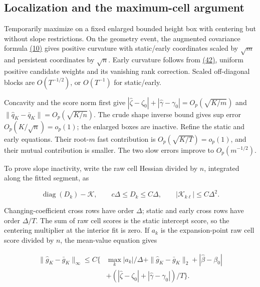 \documentclass[11pt]{article}
\begin{document}
\subsection{Localization and the maximum-cell argument}\label{sec:D.3}

Temporarily maximize on a fixed enlarged bounded height box with centering but without slope restrictions. On the geometry event, the augmented covariance formula \hyperref[eq:10]{(10)} gives positive curvature with static/early coordinates scaled by \(\sqrt m\) and persistent coordinates by \(\sqrt n\). Early curvature follows from \hyperref[eq:42]{(42)}, uniform positive candidate weights and its vanishing rank correction. Scaled off-diagonal blocks are \(O(T^{-1/2})\), or \(O(T^{-1})\) for static/early.

Concavity and the score norm first give
\(|\widehat\zeta-\zeta_0|+|\widehat\gamma-\gamma_0|=O_p(\sqrt{K/m})\)
and \(\|\widehat q_K-\bar q_K\|=O_p(\sqrt{K/n})\).
The crude shape inverse bound gives sup error \(O_p(K/\sqrt n)=o_p(1)\); the enlarged boxes are inactive. Refine the static and early equations. Their root-\(m\) fast contribution is \(O_p(\sqrt{K/T})=o_p(1)\), and their mutual contribution is smaller. The two slow errors improve to \(O_p(m^{-1/2})\).

To prove slope inactivity, write the raw cell Hessian divided by \(n\), integrated along the fitted segment, as

\begin{equation*}
\operatorname{diag}(D_k)-\mathcal K,\qquad
c\Delta\leq D_k\leq C\Delta,\qquad
|\mathcal K_{k\ell}|\leq C\Delta^2 .
\tag{D.7}\label{eq:D.7}
\end{equation*}

Changing-coefficient cross rows have order \(\Delta\); static and early cross rows have order \(\Delta/T\). The sum of raw cell scores is the static intercept score, so the centering multiplier at the interior fit is zero. If \(a_k\) is the expansion-point raw cell score divided by \(n\), the mean-value equation gives

\begin{equation*}
\begin{aligned}
\|\widehat g_K-\bar g_K\|_\infty\leq C\{&
 \max_k |a_k|/\Delta+\|\widehat g_K-\bar g_K\|_2
 +|\widehat\beta-\beta_0|\\
&+(|\widehat\zeta-\zeta_0|+|\widehat\gamma-\gamma_0|)/T\}.
\end{aligned}\tag{D.8}\label{eq:D.8}
\end{equation*}
\end{document}
